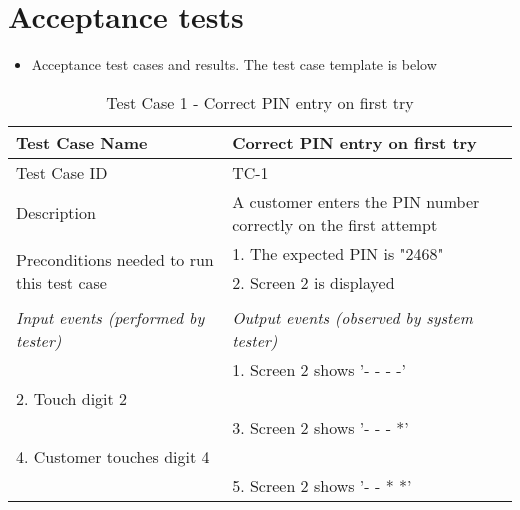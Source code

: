 \documentclass{article}
\begin{document}
\section{Acceptance tests}
\begin{itemize}
    \item Acceptance test cases and results. The test case template is below
\end{itemize}


\begin{table}[]
    \centering
    \begin{tabular}{|p{7cm}|p{8cm}|}
        \hline
        Test Case Name & Correct PIN entry on first try \\ \hline
        Test Case ID & TC-1 \\ \hline
        Description & A customer enters the PIN number correctly on the first attempt \\ \hline
        \multirow{3}{*}{Preconditions needed to run this test case} & 1. The expected PIN is "2468" \\ \cline{2-2} 
                                                                    & 2. Screen 2 is displayed \\ \hline
        \multicolumn{2}{|c|}{\textit{Event Sequence}} \\ \hline
        \textit{Input events (performed by tester)} & \textit{Output events (observed by system tester)} \\ \hline
        & 1. Screen 2 shows '- - - -' \\ \hline
        2. Touch digit 2 & \\ \hline
        & 3. Screen 2 shows '- - - *' \\ \hline
        4. Customer touches digit 4 & \\ \hline
        & 5. Screen 2 shows '- - * *' \\ \hline
    \end{tabular}
    \caption{Test Case 1 - Correct PIN entry on first try}
    \label{tab:test_case_1}
\end{table}
\end{document}
